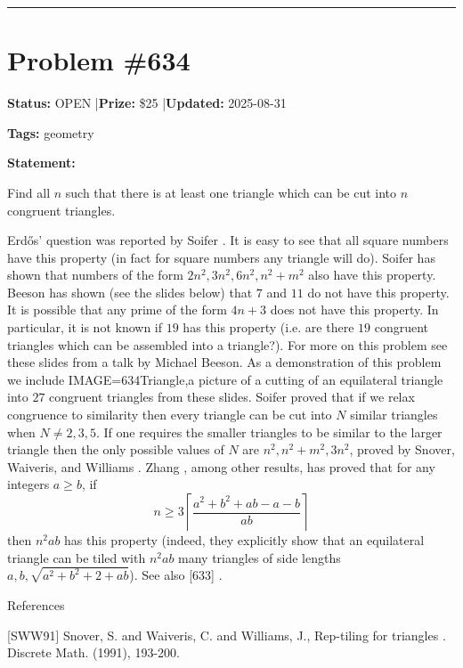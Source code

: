 \documentclass{article}
\begin{document}
\noindent\rule{\linewidth}{0.4pt}


\section{Problem \#634}
\label{prob:634}

\noindent\textbf{Status:} OPEN \quad|\quad \textbf{Prize:} \$25 \quad|\quad \textbf{Updated:} 2025-08-31

\noindent\textbf{Tags:} geometry

\medskip

\noindent\textbf{Statement:}

Find all $n$ such that there is at least one triangle which can be cut into $n$ congruent triangles.




Erd\H{o}s' question was reported by Soifer \cite{So09c}. It is easy to see that all square numbers have this property (in fact for square numbers any triangle will do). Soifer \cite{So09c} has shown that numbers of the form $2n^2,3n^2,6n^2,n^2+m^2$ also have this property. Beeson has shown (see the slides below) that $7$ and $11$ do not have this property. It is possible that any prime of the form $4n+3$ does not have this property. In particular, it is not known if $19$ has this property (i.e. are there $19$ congruent triangles which can be assembled into a triangle?). For more on this problem see these slides from a talk by Michael Beeson. As a demonstration of this problem we include {IMAGE=634Triangle,a picture} of a cutting of an equilateral triangle into $27$ congruent triangles from these slides. Soifer proved \cite{So09} that if we relax congruence to similarity then every triangle can be cut into $N$ similar triangles when $N\neq 2,3,5$. If one requires the smaller triangles to be similar to the larger triangle then the only possible values of $N$ are $n^2,n^2+m^2,3n^2$, proved by Snover, Waiveris, and Williams \cite{SWW91}. Zhang \cite{Zh25}, among other results, has proved that for any integers $a \geq b$, if\[n\geq 3\left\lceil \frac{a^2+b^2+ab-a-b}{ab}\right\rceil\]then $n^2ab$ has this property (indeed, they explicitly show that an equilateral triangle can be tiled with $n^2ab$ many triangles of side lengths $a,b,\sqrt{a^2+b^2+2+ab}$). See also [633] .




References

[SWW91] Snover, S. and Waiveris, C. and Williams, J., Rep-tiling for triangles . Discrete Math. (1991), 193-200.
\end{document}
